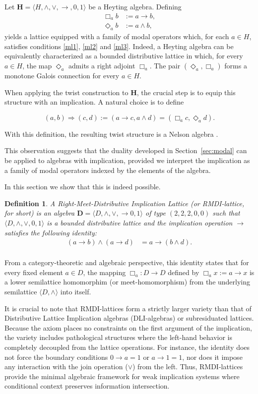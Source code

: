 \documentclass{article}
\newtheorem{definition}[theorem]{Definition}
\newcommand{\D}{\mathbf{D}}
\begin{document}
Let $\mathbf{H}=\langle H,\wedge,\vee,\to,0,1\rangle$ be a Heyting algebra. Defining
\begin{align*}
    \Box_a b &:= a \to b,\\
    \Diamond_a b &:= a \wedge b,
\end{align*}
yields a lattice equipped with a family of modal operators which, for each $a \in H$, satisfies
conditions \eqref{ml1}, \eqref{ml2} and \eqref{ml3}. Indeed, a Heyting algebra can be equivalently characterized as a bounded distributive lattice in which, for every $a\in H$, the map $\Diamond_a$ admits a right adjoint $\Box_a$. The pair $(\Diamond_a,\Box_a)$ forms a monotone Galois connection for every $a\in H$. 

When applying the twist construction to $\mathbf{H}$, the crucial step is to equip this structure with an implication. A natural choice is to define

\[(a,b)\Rightarrow(c,d):= (a\to c,a\wedge d)=(\Box_ac,\Diamond_ad).\]

With this definition, the resulting twist structure is a Nelson algebra \cite{sendlewski1990nelson}.

This observation suggests that the duality
developed in Section~\ref{sec:modal} can be applied to algebras with implication, provided we interpret
the implication as a family of modal operators indexed by the elements of the algebra.

In this section we show that this is indeed possible.
\begin{definition}
A \emph{Right-Meet-Distributive Implication Lattice} (or RMDI-lattice, for short) is an algebra $\D=\langle D, \wedge, \vee,\to 0, 1\rangle$ of type $(2, 2, 2, 0, 0)$ such that $\langle D, \wedge, \vee, 0, 1\rangle$ is a bounded distributive lattice and the implication operation $\to$ satisfies the following identity:
\begin{align*}
    (a \to b) \wedge (a \to d) &= a \to (b \wedge d). \tag{I1}\label{I1}\\
\end{align*}
\end{definition}

From a category-theoretic and algebraic perspective, this identity states that for every fixed element $a \in D$, the mapping $\Box_a: D \to D$ defined by $\Box_ax := a \to x$ is a lower semilattice homomorphim (or meet-homomorphism) from the underlying semilattice $\langle D, \wedge\rangle$ into itself.

It is crucial to note that RMDI-lattices form a strictly larger variety than that of Distributive Lattice Implication algebras (DLI-algebras) or subresiduated lattices. Because the axiom places no constraints on the first argument of the implication, the variety includes pathological structures where the left-hand behavior is completely decoupled from the lattice operations. For instance, the identity does not force the boundary conditions $0 \to a = 1$ or $a \to 1 = 1$, nor does it impose any interaction with the join operation ($\vee$) from the left. Thus, RMDI-lattices provide the minimal algebraic framework for weak implication systems where conditional context preserves information intersection.
 
\end{document}
